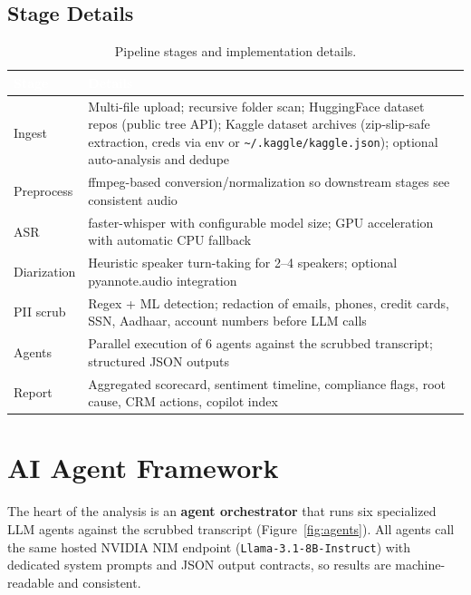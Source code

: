 \documentclass[11pt,a4paper]{article}
\begin{document}
\subsection{Stage Details}

\begin{table}[htbp]
  \centering
  \small
  \begin{tabular}{@{}p{30mm}p{115mm}@{}}
    \toprule
    \rowcolor{tablehead}
    \textcolor{white}{\textbf{Stage}} & \textcolor{white}{\textbf{Details}} \\
    \midrule
    Ingest & Multi-file upload; recursive folder scan; HuggingFace dataset repos (public tree API); Kaggle dataset archives (zip-slip-safe extraction, creds via env or \texttt{\textasciitilde/.kaggle/kaggle.json}); optional auto-analysis and dedupe \\
    Preprocess & ffmpeg-based conversion/normalization so downstream stages see consistent audio \\
    ASR & faster-whisper with configurable model size; GPU acceleration with automatic CPU fallback \\
    Diarization & Heuristic speaker turn-taking for 2--4 speakers; optional pyannote.audio integration \\
    PII scrub & Regex + ML detection; redaction of emails, phones, credit cards, SSN, Aadhaar, account numbers before LLM calls \\
    Agents & Parallel execution of 6 agents against the scrubbed transcript; structured JSON outputs \\
    Report & Aggregated scorecard, sentiment timeline, compliance flags, root cause, CRM actions, copilot index \\
    \bottomrule
  \end{tabular}
  \caption{Pipeline stages and implementation details.}
\end{table}

\section{AI Agent Framework}

The heart of the analysis is an \textbf{agent orchestrator} that runs six specialized
LLM agents against the scrubbed transcript (Figure~\ref{fig:agents}). All agents call the
same hosted NVIDIA NIM endpoint (\texttt{Llama-3.1-8B-Instruct}) with dedicated system
prompts and JSON output contracts, so results are machine-readable and consistent.
\end{document}
